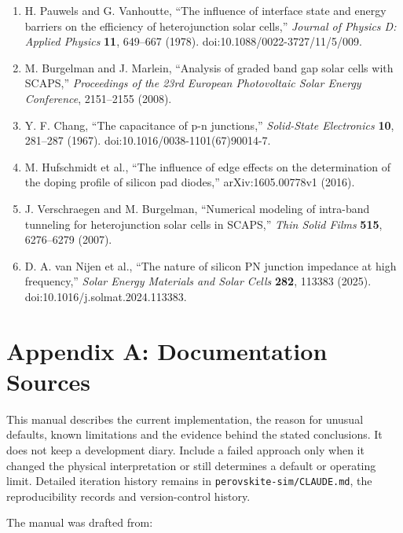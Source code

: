 \documentclass[
  11pt,
  american,
]{report}
\begin{document}
\begin{enumerate}
  dynamics of electrolytes at large applied voltages. II. Modified
  Poisson-Nernst-Planck equations,'' \emph{Physical Review E}
  \textbf{75}, 021503 (2007). doi:10.1103/PhysRevE.75.021503.
\item
  H. Pauwels and G. Vanhoutte, ``The influence of interface state and
  energy barriers on the efficiency of heterojunction solar cells,''
  \emph{Journal of Physics D: Applied Physics} \textbf{11}, 649--667
  (1978). doi:10.1088/0022-3727/11/5/009.
\item
  M. Burgelman and J. Marlein, ``Analysis of graded band gap solar cells
  with SCAPS,'' \emph{Proceedings of the 23rd European Photovoltaic
  Solar Energy Conference}, 2151--2155 (2008).
\item
  Y. F. Chang, ``The capacitance of p-n junctions,'' \emph{Solid-State
  Electronics} \textbf{10}, 281--287 (1967).
  doi:10.1016/0038-1101(67)90014-7.
\item
  M. Hufschmidt et al., ``The influence of edge effects on the
  determination of the doping profile of silicon pad diodes,''
  arXiv:1605.00778v1 (2016).
\item
  J. Verschraegen and M. Burgelman, ``Numerical modeling of intra-band
  tunneling for heterojunction solar cells in SCAPS,'' \emph{Thin Solid
  Films} \textbf{515}, 6276--6279 (2007).
\item
  D. A. van Nijen et al., ``The nature of silicon PN junction impedance
  at high frequency,'' \emph{Solar Energy Materials and Solar Cells}
  \textbf{282}, 113383 (2025). doi:10.1016/j.solmat.2024.113383.
\end{enumerate}

\hypertarget{appendix-a-documentation-sources}{%
\chapter{Appendix A: Documentation
Sources}\label{appendix-a-documentation-sources}}

This manual describes the current implementation, the reason for unusual
defaults, known limitations and the evidence behind the stated
conclusions. It does not keep a development diary. Include a failed
approach only when it changed the physical interpretation or still
determines a default or operating limit. Detailed iteration history
remains in \texttt{perovskite-sim/CLAUDE.md}, the reproducibility
records and version-control history.

The manual was drafted from:
\end{document}
